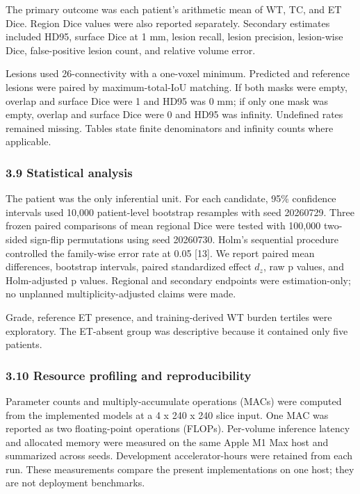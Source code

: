\documentclass[
  10pt,
  letterpaper,
]{article}
\begin{document}
The primary outcome was each patient's arithmetic mean of WT, TC, and ET
Dice. Region Dice values were also reported separately. Secondary
estimates included HD95, surface Dice at 1 mm, lesion recall, lesion
precision, lesion-wise Dice, false-positive lesion count, and relative
volume error.

Lesions used 26-connectivity with a one-voxel minimum. Predicted and
reference lesions were paired by maximum-total-IoU matching. If both
masks were empty, overlap and surface Dice were 1 and HD95 was 0 mm; if
only one mask was empty, overlap and surface Dice were 0 and HD95 was
infinity. Undefined rates remained missing. Tables state finite
denominators and infinity counts where applicable.

\subsubsection{3.9 Statistical analysis}\label{statistical-analysis}

The patient was the only inferential unit. For each candidate, 95\%
confidence intervals used 10,000 patient-level bootstrap resamples with
seed 20260729. Three frozen paired comparisons of mean regional Dice
were tested with 100,000 two-sided sign-flip permutations using seed
20260730. Holm's sequential procedure controlled the family-wise error
rate at 0.05 {[}13{]}. We report paired mean differences, bootstrap
intervals, paired standardized effect \(d_z\), raw p values, and
Holm-adjusted p values. Regional and secondary endpoints were
estimation-only; no unplanned multiplicity-adjusted claims were made.

Grade, reference ET presence, and training-derived WT burden tertiles
were exploratory. The ET-absent group was descriptive because it
contained only five patients.

\subsubsection{3.10 Resource profiling and
reproducibility}\label{resource-profiling-and-reproducibility}

Parameter counts and multiply-accumulate operations (MACs) were computed
from the implemented models at a 4 x 240 x 240 slice input. One MAC was
reported as two floating-point operations (FLOPs). Per-volume inference
latency and allocated memory were measured on the same Apple M1 Max host
and summarized across seeds. Development accelerator-hours were retained
from each run. These measurements compare the present implementations on
one host; they are not deployment benchmarks.
\end{document}
